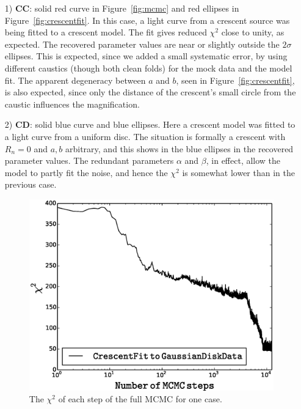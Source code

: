 \begin{enumerate}

\item[1) {\bf CC}:] solid red curve in Figure~\ref{fig:mcmc} and red
  ellipses in Figure~\ref{fig:crescentfit}.  In this case, a light
  curve from a crescent source was being fitted to a crescent model.
  The fit gives reduced $\chi^2$ close to unity, as expected.  The
  recovered parameter values are near or slightly outside the
  $2\sigma$ ellipses.  This is expected, since we added a small
  systematic error, by using different caustics (though both clean
  folds) for the mock data and the model fit.  The apparent degeneracy
  between $a$ and $b$, seen in Figure~\ref{fig:crescentfit}, is also
  expected, since only the distance of the crescent's small circle
  from the caustic influences the magnification.


\item[2) {\bf CD}:] solid blue curve and blue ellipses.  Here a
  crescent model was fitted to a light curve from a uniform disc.  The
  situation is formally a crescent with $R_n=0$ and $a,b$ arbitrary,
  and this shows in the blue ellipses in the recovered parameter
  values.  The redundant parameters $\alpha$ and $\beta$, in effect, allow the
  model to partly fit the noise, and hence the $\chi^2$ is somewhat
  lower than in the previous case.

\begin{figure}
\centering
\includegraphics[width=0.9\hsize,bb=0 0 576 432
                ]{plots/burnin_cg.eps}
\caption{\label{fig:burnin} The $\chi^2$ of each step of the full MCMC
  for one case.}
\end{figure}


\end{enumerate}
